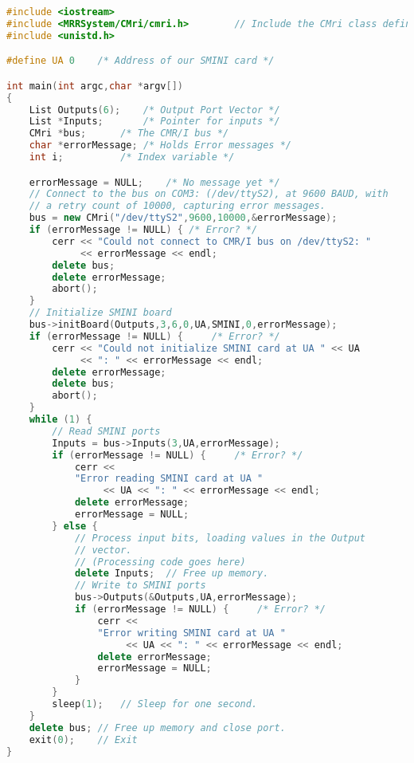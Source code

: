 \begin{lstlisting}[caption={Using the CMR/I from C++, more realistic version},
		   language=C++,
		   label=lst:CMRI:Cpp2]
#include <iostream>
#include <MRRSystem/CMri/cmri.h>        // Include the CMri class definition
#include <unistd.h>

#define UA 0    /* Address of our SMINI card */

int main(int argc,char *argv[])
{
	List Outputs(6);	/* Output Port Vector */
	List *Inputs;		/* Pointer for inputs */
	CMri *bus;		/* The CMR/I bus */
	char *errorMessage;	/* Holds Error messages */
	int i;			/* Index variable */

	errorMessage = NULL;	/* No message yet */
	// Connect to the bus on COM3: (/dev/ttyS2), at 9600 BAUD, with
	// a retry count of 10000, capturing error messages.
	bus = new CMri("/dev/ttyS2",9600,10000,&errorMessage);
	if (errorMessage != NULL) {	/* Error? */
		cerr << "Could not connect to CMR/I bus on /dev/ttyS2: " 
		     << errorMessage << endl;
		delete bus;
		delete errorMessage;
		abort();
	}
	// Initialize SMINI board
	bus->initBoard(Outputs,3,6,0,UA,SMINI,0,errorMessage);
	if (errorMessage != NULL) {     /* Error? */  
		cerr << "Could not initialize SMINI card at UA " << UA
		     << ": " << errorMessage << endl;
		delete errorMessage;
		delete bus;
		abort();
	}
	while (1) {
		// Read SMINI ports
		Inputs = bus->Inputs(3,UA,errorMessage);
		if (errorMessage != NULL) {     /* Error? */
			cerr <<
			"Error reading SMINI card at UA "
			     << UA << ": " << errorMessage << endl;
			delete errorMessage;
			errorMessage = NULL;
		} else {
			// Process input bits, loading values in the Output
			// vector.
			// (Processing code goes here)
			delete Inputs; 	// Free up memory.
			// Write to SMINI ports
			bus->Outputs(&Outputs,UA,errorMessage);
			if (errorMessage != NULL) {     /* Error? */
				cerr << 
				"Error writing SMINI card at UA " 
				     << UA << ": " << errorMessage << endl;
				delete errorMessage;
				errorMessage = NULL;
			}
		}
		sleep(1);	// Sleep for one second.
	}
	delete bus;	// Free up memory and close port.
	exit(0);	// Exit
}
\end{lstlisting}
